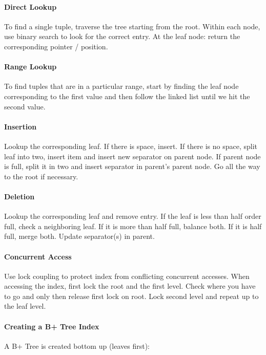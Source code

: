 \paragraph{Direct Lookup}
To find a single tuple, traverse the tree starting from the root. Within each node, use binary search to look for the correct entry. At the leaf node: return the corresponding pointer / position.

\paragraph{Range Lookup}
To find tuples that are in a particular range, start by finding the leaf node corresponding to the first value and then follow the linked list until we hit the second value.

\paragraph{Insertion}
Lookup the corresponding leaf. If there is space, insert. If there is no space, split leaf into two, insert item and insert new separator on parent node. If parent node is full, split it in two and insert separator in parent's parent node. Go all the way to the root if necessary. %

\paragraph{Deletion}
Lookup the corresponding leaf and remove entry. If the leaf is less than half order full, check a neighboring leaf. If it is more than half full, balance both. If it is half full, merge both. Update separator(s) in parent. %

\paragraph{Concurrent Access}
Use lock coupling to protect index from conflicting concurrent accesses. When accessing the index, first lock the root and the first level. Check where you have to go and only then release first lock on root. Lock second level and repeat up to the leaf level. %

\paragraph{Creating a B+ Tree Index}
A B+ Tree is created bottom up (leaves first):

